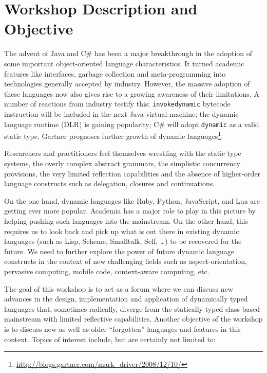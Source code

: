 \documentclass[runningheads]{llncs}
\begin{document}

\section{Workshop Description and Objective}

The advent of Java and C\# has been a major breakthrough in the adoption of some important object-oriented language characteristics. It turned academic features like interfaces, garbage collection and meta-programming into technologies generally accepted by industry. However, the massive adoption of these languages now also gives rise to a growing awareness of their limitations. 
A number of reactions from industry testify this: {\tt invokedynamic} bytecode instruction will be included in the next Java virtual machine; the dynamic language runtime (DLR) is gaining popularity; C\# will adopt  {\tt dynamic} as a valid static type.  %
Gartner prognoses further growth of dynamic languages\footnote{\url{http://blogs.gartner.com/mark_driver/2008/12/10/}}.

Researchers and practitioners feel themselves wrestling with the static type systems, the overly complex abstract grammars, the simplistic concurrency provisions, the very limited reflection capabilities and the absence of higher-order language constructs such as delegation, closures and continuations.

On the one hand, dynamic languages like Ruby, Python, JavaScript, and Lua are getting ever more popular. Academia has a major role to play in this picture by helping pushing such languages into the mainstream. On the other hand, this requires us to look back and pick up what is out there in existing dynamic languages (such as Lisp, Scheme, Smalltalk, Self, \dots) to be recovered for the future. We need to further explore the power of future dynamic language constructs in the context of new challenging fields such as aspect-orientation, pervasive computing, mobile code, context-aware computing, etc. 

The goal of this workshop is to act as a forum where we can discuss new advances in the design, implementation and application of dynamically typed languages that, sometimes radically, diverge from the  statically typed class-based mainstream with limited reflective capabilities. Another objective of the workshop is to discuss new as well as older ``forgotten'' languages and features in this context. Topics of interest include, but are certainly not limited to: 
\end{document}
